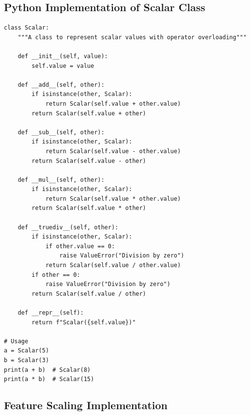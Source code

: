 \documentclass[11pt,a4paper]{article}
\begin{document}
\subsection{Python Implementation of Scalar Class}

\begin{lstlisting}
class Scalar:
    """A class to represent scalar values with operator overloading"""
    
    def __init__(self, value):
        self.value = value
    
    def __add__(self, other):
        if isinstance(other, Scalar):
            return Scalar(self.value + other.value)
        return Scalar(self.value + other)
    
    def __sub__(self, other):
        if isinstance(other, Scalar):
            return Scalar(self.value - other.value)
        return Scalar(self.value - other)
    
    def __mul__(self, other):
        if isinstance(other, Scalar):
            return Scalar(self.value * other.value)
        return Scalar(self.value * other)
    
    def __truediv__(self, other):
        if isinstance(other, Scalar):
            if other.value == 0:
                raise ValueError("Division by zero")
            return Scalar(self.value / other.value)
        if other == 0:
            raise ValueError("Division by zero")
        return Scalar(self.value / other)
    
    def __repr__(self):
        return f"Scalar({self.value})"

# Usage
a = Scalar(5)
b = Scalar(3)
print(a + b)  # Scalar(8)
print(a * b)  # Scalar(15)
\end{lstlisting}

\subsection{Feature Scaling Implementation}
\end{document}
